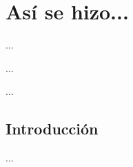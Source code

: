 %
%

\chapter{Así se hizo...}
\label{ap1:AsiSeHizo}

\begin{FraseCelebre}
\begin{Frase}
...
\end{Frase}
\begin{Fuente}
...
\end{Fuente}
\end{FraseCelebre}

\begin{resumen}
...
\end{resumen}

\section{Introducción}
\label{ap1:intro}

...

